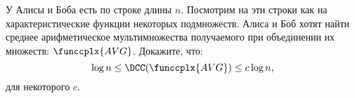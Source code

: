 У Алисы и Боба есть по строке длины $n$. Посмотрим на эти строки как на характеристические функции
некоторых подмножеств. Алиса и Боб хотят найти среднее арифметическое мультимножества получаемого при
объединении их множеств: $\funccplx{AVG}$. Докажите, что:
$$\log n \le \DCC(\funccplx{AVG}) \leq c \log n,$$
для некоторого $c$.
